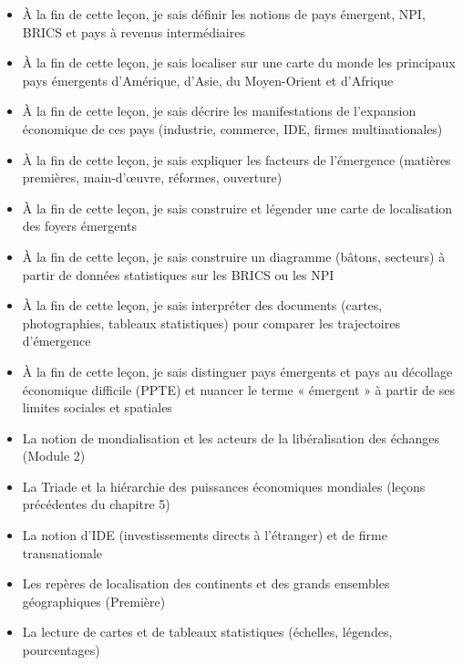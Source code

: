 \documentclass[11pt]{article}
\begin{document}
\begin{objectifs}
\begin{itemize}
\item À la fin de cette leçon, je sais définir les notions de pays émergent, NPI, BRICS et pays à revenus intermédiaires
\item À la fin de cette leçon, je sais localiser sur une carte du monde les principaux pays émergents d'Amérique, d'Asie, du Moyen-Orient et d'Afrique
\item À la fin de cette leçon, je sais décrire les manifestations de l'expansion économique de ces pays (industrie, commerce, IDE, firmes multinationales)
\item À la fin de cette leçon, je sais expliquer les facteurs de l'émergence (matières premières, main-d'œuvre, réformes, ouverture)
\item À la fin de cette leçon, je sais construire et légender une carte de localisation des foyers émergents
\item À la fin de cette leçon, je sais construire un diagramme (bâtons, secteurs) à partir de données statistiques sur les BRICS ou les NPI
\item À la fin de cette leçon, je sais interpréter des documents (cartes, photographies, tableaux statistiques) pour comparer les trajectoires d'émergence
\item À la fin de cette leçon, je sais distinguer pays émergents et pays au décollage économique difficile (PPTE) et nuancer le terme « émergent » à partir de ses limites sociales et spatiales
\end{itemize}
\end{objectifs}

\begin{prerequis}
\begin{itemize}
\item La notion de mondialisation et les acteurs de la libéralisation des échanges (Module 2)
\item La Triade et la hiérarchie des puissances économiques mondiales (leçons précédentes du chapitre 5)
\item La notion d'IDE (investissements directs à l'étranger) et de firme transnationale
\item Les repères de localisation des continents et des grands ensembles géographiques (Première)
\item La lecture de cartes et de tableaux statistiques (échelles, légendes, pourcentages)
\end{itemize}
\end{prerequis}
\end{document}
